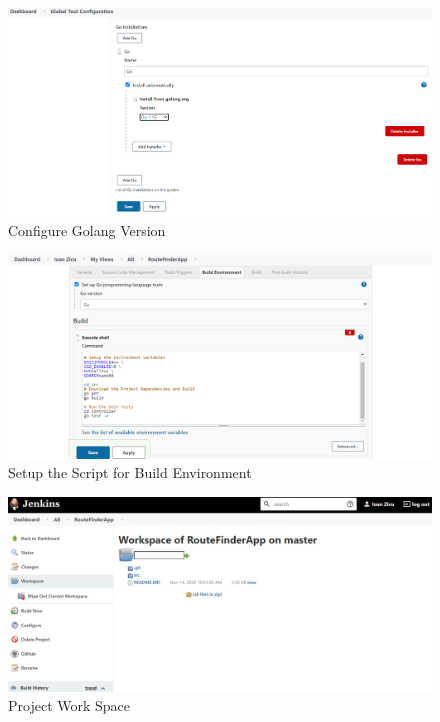 \documentclass[12pt,a4paper,twoside]{article}
\begin{document}
\begin{figure}[h!]
    \centering
        \includegraphics[width=15cm]{images-aws/41-go-global-tool.png}
        \caption{Configure Golang Version}
\end{figure}


\begin{figure}[h!]
    \centering
        \includegraphics[width=15cm]{images-aws/42-project-build-env-golang-.png}
        \caption{Setup the Script for Build Environment}
\end{figure}

\begin{figure}[h!]
    \centering
        \includegraphics[width=15cm]{images-aws/44-project-workspace-git.png}
        \caption{Project Work Space}
\end{figure}
\end{document}
